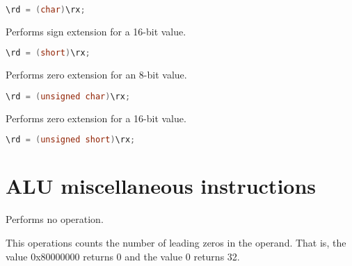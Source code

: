 \begin{lstlisting}[numbers=none, basicstyle=\ttfamily\footnotesize, language=C++]
\rd = (char)\rx;
\end{lstlisting}

Performs sign extension for a 16-bit value.

\begin{lstlisting}[numbers=none, basicstyle=\ttfamily\footnotesize, language=C++]
\rd = (short)\rx;
\end{lstlisting}

Performs zero extension for an 8-bit value.

\begin{lstlisting}[numbers=none, basicstyle=\ttfamily\footnotesize, language=C++]
\rd = (unsigned char)\rx;
\end{lstlisting}

Performs zero extension for a 16-bit value.

\begin{lstlisting}[numbers=none, basicstyle=\ttfamily\footnotesize, language=C++]
\rd = (unsigned short)\rx;
\end{lstlisting}

\section{ALU miscellaneous instructions}

Performs no operation.

This operations counts the number of leading zeros in the operand. That is, the
value 0x80000000 returns 0 and the value 0 returns 32.


